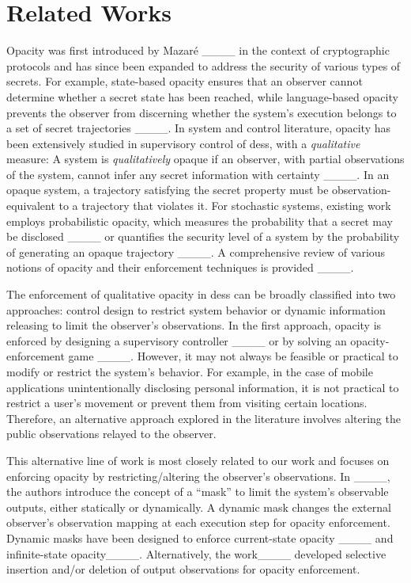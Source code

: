 \section{Related Works}
Opacity was first introduced by Mazar\'e ____  in the context of cryptographic protocols and has since been expanded to address the security of various types of secrets. For example, state-based opacity ensures that an observer cannot determine whether a secret state has been reached, while language-based opacity prevents the observer from discerning whether the system's execution belongs to a set of secret trajectories ____. In system and control literature,
opacity has been extensively studied in supervisory control of \ac{des}s, with a \emph{qualitative} measure: A system is \emph{qualitatively} opaque if an observer, with partial observations of the system, cannot infer any secret information with certainty ____. In an opaque system, a trajectory satisfying the secret property must be observation-equivalent to a trajectory that violates it.
For stochastic systems, existing work employs probabilistic opacity, which measures the probability that a secret may be disclosed ____ or quantifies the security level of a system by the probability of generating an opaque trajectory ____. A comprehensive review of various notions of opacity and their enforcement techniques is provided ____. 

The enforcement of qualitative opacity in \ac{des}s can be broadly classified into two approaches:    control design to restrict system behavior or dynamic information releasing to limit the observer's observations. In the first approach, opacity is enforced by designing a supervisory controller ____ or by solving an opacity-enforcement game ____. 
However, it may not always be feasible or practical to modify or restrict the system's behavior. For example, in the case of mobile applications unintentionally disclosing personal information, it is not practical to restrict a user's movement or prevent them from visiting certain locations. Therefore, an alternative approach explored in the literature involves altering the public observations relayed to the observer. 

This alternative line of work is most closely related to our work and focuses on enforcing opacity by restricting/altering the observer's observations. In  ____, the authors introduce the concept of a ``mask''   to limit the system's observable outputs, either statically or dynamically. A dynamic mask changes   the external observer's observation mapping at each execution step for opacity enforcement. Dynamic masks have been designed to enforce current-state opacity ____   and infinite-state opacity____. Alternatively,  the work____ developed  selective insertion and/or deletion of output observations for opacity enforcement. %

